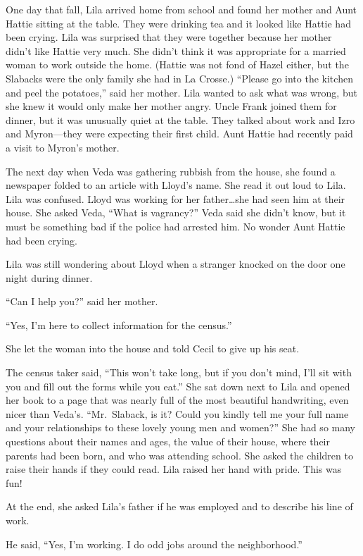\documentclass[
  letterpaper,
]{book}
\begin{document}
One day that fall, Lila arrived home from school and found her mother
and Aunt Hattie sitting at the table. They were drinking tea and it
looked like Hattie had been crying. Lila was surprised that they were
together because her mother didn't like Hattie very much. She didn't
think it was appropriate for a married woman to work outside the home.
(Hattie was not fond of Hazel either, but the Slabacks were the only
family she had in La Crosse.) ``Please go into the kitchen and peel the
potatoes,'' said her mother. Lila wanted to ask what was wrong, but she
knew it would only make her mother angry. Uncle Frank joined them for
dinner, but it was unusually quiet at the table. They talked about work
and Izro and Myron---they were expecting their first child. Aunt Hattie
had recently paid a visit to Myron's mother.

The next day when Veda was gathering rubbish from the house, she found a
newspaper folded to an article with Lloyd's name. She read it out loud
to Lila. Lila was confused. Lloyd was working for her father\ldots she
had seen him at their house. She asked Veda, ``What is vagrancy?'' Veda
said she didn't know, but it must be something bad if the police had
arrested him. No wonder Aunt Hattie had been crying.

Lila was still wondering about Lloyd when a stranger knocked on the door
one night during dinner.

``Can I help you?'' said her mother.

``Yes, I'm here to collect information for the census.''

She let the woman into the house and told Cecil to give up his seat.

The census taker said, ``This won't take long, but if you don't mind,
I'll sit with you and fill out the forms while you eat.'' She sat down
next to Lila and opened her book to a page that was nearly full of the
most beautiful handwriting, even nicer than Veda's. ``Mr.~Slaback, is
it? Could you kindly tell me your full name and your relationships to
these lovely young men and women?'' She had so many questions about
their names and ages, the value of their house, where their parents had
been born, and who was attending school. She asked the children to raise
their hands if they could read. Lila raised her hand with pride. This
was fun!

At the end, she asked Lila's father if he was employed and to describe
his line of work.

He said, ``Yes, I'm working. I do odd jobs around the neighborhood.''
\end{document}
